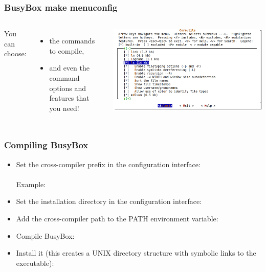 \begin{frame}
  \frametitle{BusyBox make menuconfig}
  \begin{columns}
    You can choose:
    \begin{itemize}
    \item the commands to compile,
    \item and even the command options and features that you need!
    \end{itemize}
    \includegraphics[width=\textwidth]{slides/sysdev-busybox/menuconfig-screenshot.png}
  \end{columns}
\end{frame}

\begin{frame}
  \frametitle{Compiling BusyBox}
  \begin{itemize}
  \item Set the cross-compiler prefix in the configuration interface: \\
    \\
    Example: 
  \item Set the installation directory in the configuration interface: \\
  \item Add the cross-compiler path to the PATH environment variable:\\
  \item Compile BusyBox:\\
  \item Install it (this creates a UNIX directory structure with symbolic
    links to the  executable):\\
  \end{itemize}
\end{frame}

